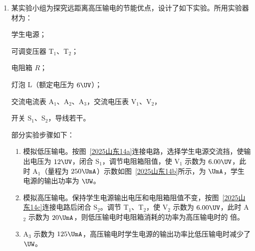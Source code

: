 \documentclass[\gkver]{gaokaozhenti}
\begin{document}
\begin{enumerate}


\item
某实验小组为探究远距离高压输电的节能优点，设计了如下实验。所用实验器材为：

学生电源；

可调变压器 T$_{1}$、T$_{2}$；

电阻箱 $R$；

灯泡 L（额定电压为 $6 \UV$）；

交流电流表 A$_{1}$、A$_{2}$、A$_{3}$，交流电压表 V$_{1}$、V$_{2}$，

开关 S$_{1}$、S$_{2}$，导线若干。

部分实验步骤如下：
\begin{enumerate}
	\item
	模拟低压输电。按图~\ref{2025山东14a}连接电路，选择学生电源交流挡，使输出电压为 $12 \UV$，闭合 S$_{1}$，调节电阻箱阻值，使 V$_{1}$ 示数为 $6.00 \UV$，此时 A$_{1}$（量程为 $250 \UmA$）示数如图~\ref{2025山东14b}所示，为  $\UmA$，学生电源的输出功率为  $\UW$。
	\item
	模拟高压输电。保持学生电源输出电压和电阻箱阻值不变，按图~\ref{2025山东14c}连接电路后闭合 S$_{2}$。调节 T$_{1}$、T$_{2}$，使 V$_{2}$ 示数为 $6.00 \UV$，此时 A$_{2}$ 示数为 $20 \UmA$，则低压输电时电阻箱消耗的功率为高压输电时的  倍。
	\item
	A$_{3}$ 示数为 $125 \UmA$，高压输电时学生电源的输出功率比低压输电时减少了  $\UW$。
\end{enumerate}


\end{enumerate}
\end{document}
